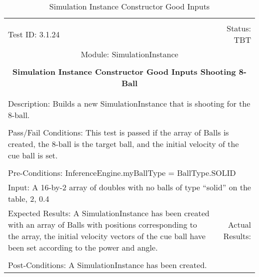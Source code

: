 \documentclass[titlepage]{article}
\begin{document}
\begin{center}%
\begin{table}[h!]
\begin{tabular}{|l r|}\hline&\\[-2mm]
	Test ID: 3.1.24	&Status: TBT\\[-3mm]
	\multicolumn{2}{|c|}{Module: SimulationInstance}\\&\\
	\multicolumn{2}{|c|}{\textbf{\large{Simulation Instance Constructor Good Inputs Shooting 8-Ball}}}\\&\\\hline&\\[-3mm]
	\multicolumn{2}{|p{\textwidth}|}{Description: Builds a new SimulationInstance that is shooting for the 8-ball.}\\[1mm]\hline&\\[-3mm]
	\multicolumn{2}{|p{\textwidth}|}{Pass/Fail Conditions: This test is passed if the array of Balls is created, the 8-ball is the target ball, and the initial velocity of the cue ball is set.}\\[1mm]\hline&\\[-3mm]
	\multicolumn{2}{|p{\textwidth}|}{Pre-Conditions: InferenceEngine.myBallType = BallType.SOLID}\\[4mm]
	\multicolumn{2}{|p{\textwidth}|}{Input: A 16-by-2 array of doubles with no balls of type ``solid'' on the table, 2, 0.4}\\[2mm]\hline
	\multicolumn{1}{|p{0.49\textwidth}}{Expected Results: A SimulationInstance has been created with an array of Balls with positions corresponding to the array, the initial velocity vectors of the cue ball have been set according to the power and angle.}	&\multicolumn{1}{|p{0.45\textwidth}|}{Actual Results: }\\\hline&\\[-3mm]
	\multicolumn{2}{|p{\textwidth}|}{Post-Conditions: A SimulationInstance has been created.}\\\hline
\end{tabular}
\caption{Simulation Instance Constructor Good Inputs}
\end{table}
\end{center}
\end{document}
